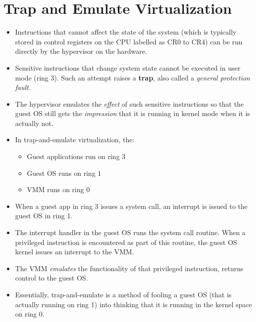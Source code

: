 \documentclass{article}
\begin{document}
\section{Trap and Emulate Virtualization}
\begin{itemize}
    \item Instructions that cannot affect the state of the system (which is typically stored in control registers on the CPU labelled as CR0 to CR4) can be run directly by the hypervisor on the hardware.
    
    \item Sensitive instructions that change system state cannot be executed in user mode (ring 3). Such an attempt raises a \textbf{trap}, also called a \textit{general protection fault}. 
    
    \item The hypervisor emulates the \textit{effect} of such sensitive instructions so that the guest OS still gets the \textit{impression} that it is running in kernel mode when it is actually not. 
    
    \item In trap-and-emulate virtualization, the:
    \begin{itemize}
        \item Guest applications run on ring 3
        
        \item Guest OS runs on ring 1
        
        \item VMM runs on ring 0
    \end{itemize}
    
    \item When a guest app in ring 3 issues a system call, an interrupt is issued to the guest OS in ring 1. 
    
    \item The interrupt handler in the guest OS runs the system call routine. When a privileged instruction is encountered as part of this routine, the guest OS kernel issues an interrupt to the VMM. 
    
    \item The VMM \textit{emulates} the functionality of that privileged instruction, returns control to the guest OS. 
    
    \item Essentially, trap-and-emulate is a method of fooling a guest OS (that is actually running on ring 1) into thinking that it is running in the kernel space on ring 0. 
\end{itemize}
\end{document}
